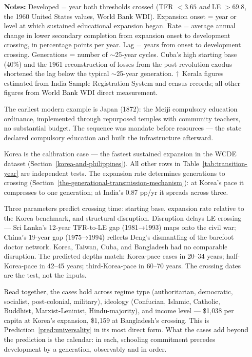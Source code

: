 \documentclass[12pt,letterpaper]{article}
\begin{document}
\begin{minipage}{\dimexpr\textwidth-2em}
\scriptsize
\textbf{Notes:} Developed = year both thresholds crossed (TFR
$<3.65$ \emph{and} LE $>69.8$, the 1960 United States values, World
Bank WDI). Expansion onset = year or level at which sustained
educational expansion began. Rate = average annual change in lower
secondary completion from expansion onset to development crossing,
in percentage points per year. Lag = years from onset to development
crossing. Generations = number of $\sim$25-year cycles. Cuba's high
starting base (40\%) and the 1961 reconstruction of losses from the
post-revolution exodus shortened the lag below the typical
$\sim$25-year generation. $\dagger$~Kerala figures estimated from
India Sample Registration System and census records; all other
figures from World Bank WDI direct measurement.
\end{minipage}

The earliest modern example is Japan (1872): the Meiji compulsory
education ordinance, implemented through repurposed temples with
community teachers, no substantial budget. The sequence was mandate
before resources --- the state declared compulsory education and built
the infrastructure afterward.

Korea is the calibration case --- the fastest sustained expansion in
the WCDE dataset (Section~\ref{korea-and-philippines}). All other rows in
Table~\ref{tab:transition-year} are independent tests. The expansion rate determines
generations to crossing
(Section~\ref{the-generational-transmission-mechanism}): at Korea's
pace it compresses to one generation; at India's 0.87 pp/yr it spreads
across three.

Three parameters predict crossing time: starting base, expansion rate
relative to the Korea benchmark, and structural disruption. Disruption
delays LE crossing --- Sri Lanka's 12-year TFR-to-LE gap (1981→1993)
maps onto the civil war; China's 19-year gap (1975→1994) reflects
Deng's dismantling of the barefoot doctor network. Korea, Taiwan, Cuba,
and Bangladesh had no comparable disruption. The predicted depths match:
Korea-pace cases in 20--34 years; half-Korea-pace in 42--45 years;
third-Korea-pace in 60--70 years. The crossing dates are the test, not
the inputs.

Read together, the cases hold across regime type (authoritarian,
democratic, socialist, post-colonial, military), ideology (Confucian,
Islamic, Catholic, Buddhist, Marxist-Leninist, Hindu-majority), and
income level --- \$1,038 per capita at Korea's expansion, \$1,159 at
Bangladesh's crossing. This is Prediction~\ref{pred:universality} in
its most direct form. What the cases add beyond the prediction is the
calendar: in each, schooling commitment precedes development by a
generation, observably and in order.
\end{document}
